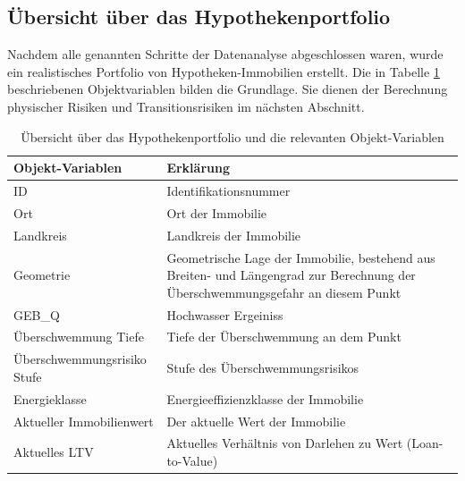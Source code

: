 \subsection{Übersicht über das Hypothekenportfolio}
Nachdem alle genannten Schritte der Datenanalyse abgeschlossen waren, wurde ein realistisches Portfolio von Hypotheken-Immobilien erstellt. Die in Tabelle \ref{tab:objekt-variablen} beschriebenen Objektvariablen bilden die Grundlage. Sie dienen der Berechnung physischer Risiken und Transitionsrisiken im nächsten Abschnitt.
\begin{table}[htbp]
    \centering
    \small
    \caption{Übersicht über das Hypothekenportfolio und die relevanten Objekt-Variablen}
    \label{tab:objekt-variablen}
    \begin{tabularx}{1.0\textwidth}{>{\raggedright\arraybackslash}X >{\raggedright\arraybackslash}X}
        \toprule
        \textbf{Objekt-Variablen} & \textbf{Erklärung} \\
        \midrule
        ID & Identifikationsnummer \\
        \addlinespace
        Ort & Ort der Immobilie \\
        \addlinespace
        Landkreis & Landkreis der Immobilie \\
        \addlinespace
        Geometrie & Geometrische Lage der Immobilie, bestehend aus Breiten- und Längengrad zur Berechnung der Überschwemmungsgefahr an diesem Punkt \\
        \addlinespace
        GEB\_Q & Hochwasser Ergeiniss \\
        \addlinespace
        Überschwemmung Tiefe & Tiefe der Überschwemmung an dem Punkt \\
        \addlinespace
        Überschwemmungsrisiko Stufe & Stufe des Überschwemmungsrisikos \\
        \addlinespace
        Energieklasse & Energieeffizienzklasse der Immobilie \\
        \addlinespace
        Aktueller Immobilienwert & Der aktuelle Wert der Immobilie \\
        \addlinespace
        Aktuelles LTV & Aktuelles Verhältnis von Darlehen zu Wert (Loan-to-Value) \\

        \bottomrule
    \end{tabularx}
\end{table}


